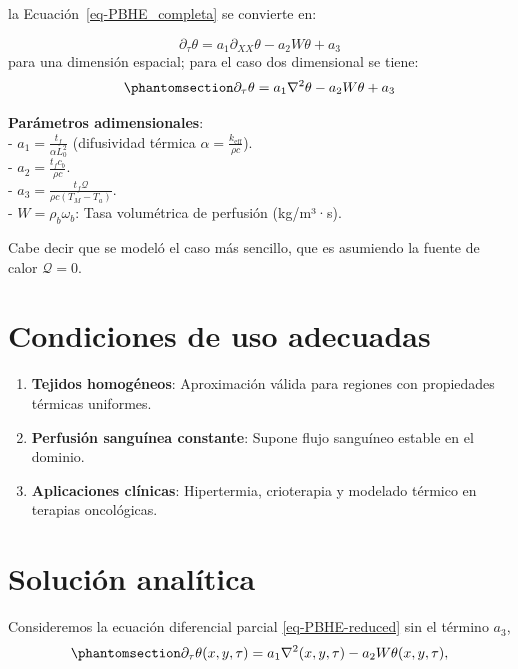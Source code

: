 \documentclass[
  spanish,
  us-letterpaper,
]{scrreprt}
\providecommand{\tightlist}{%
  \setlength{\itemsep}{0pt}\setlength{\parskip}{0pt}}
\theoremstyle{definition}
\theoremstyle{plain}
\theoremstyle{remark}
\begin{document}
la Ecuación~\ref{eq-PBHE_completa} se convierte en:

\[
\partial_{\tau} \theta = a_1 \partial_{XX} \theta - a_2 W \theta + a_3
\] para una dimensión espacial; para el caso dos dimensional se tiene:
\begin{equation}\phantomsection\label{eq-PBHE-reduced}{
\partial_{\tau} \theta = a_1 \nabla^2  \theta - a_2 W \theta + a_3
}\end{equation}

\textbf{Parámetros adimensionales}:\\
- \(a_1 = \frac{t_f}{\alpha L_0^2}\) (difusividad térmica
\(\alpha = \frac{k_{\text{eff}}}{\rho c}\)).\\
- \(a_2 = \frac{t_f c_b}{\rho c}\).\\
- \(a_3 = \frac{t_f \mathcal{Q}}{\rho c (T_M - T_a)}\).\\
- \(W = \rho_b \omega_b\): Tasa volumétrica de perfusión (kg/m³·s).

Cabe decir que se modeló el caso más sencillo, que es asumiendo la
fuente de calor \(\mathcal{Q} = 0\).

\section{Condiciones de uso
adecuadas}\label{condiciones-de-uso-adecuadas}

\begin{enumerate}
\def\labelenumi{\arabic{enumi}.}
\tightlist
\item
  \textbf{Tejidos homogéneos}: Aproximación válida para regiones con
  propiedades térmicas uniformes.\\
\item
  \textbf{Perfusión sanguínea constante}: Supone flujo sanguíneo estable
  en el dominio.\\
\item
  \textbf{Aplicaciones clínicas}: Hipertermia, crioterapia y modelado
  térmico en terapias oncológicas.
\end{enumerate}

\section{Solución analítica}\label{sec-sol-ana}

Consideremos la ecuación diferencial parcial \ref{eq-PBHE-reduced} sin
el término \(a_3\),
\begin{equation}\phantomsection\label{eq-PBHE-wout-a3}{
\partial _\tau \theta(x,y,\tau) = a_1 \nabla^2(x,y,\tau) - a_2W\theta(x,y,\tau),
}\end{equation}
\end{document}
